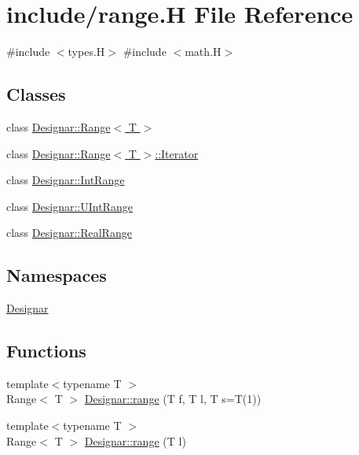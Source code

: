 \hypertarget{range_8_h}{}\section{include/range.H File Reference}
\label{range_8_h}
{\ttfamily \#include $<$types.\+H$>$}\newline
{\ttfamily \#include $<$math.\+H$>$}\newline
\subsection*{Classes}
\begin{DoxyCompactItemize}
\item 
class \hyperlink{class_designar_1_1_range}{Designar\+::\+Range$<$ T $>$}
\item 
class \hyperlink{class_designar_1_1_range_1_1_iterator}{Designar\+::\+Range$<$ T $>$\+::\+Iterator}
\item 
class \hyperlink{class_designar_1_1_int_range}{Designar\+::\+Int\+Range}
\item 
class \hyperlink{class_designar_1_1_u_int_range}{Designar\+::\+U\+Int\+Range}
\item 
class \hyperlink{class_designar_1_1_real_range}{Designar\+::\+Real\+Range}
\end{DoxyCompactItemize}
\subsection*{Namespaces}
\begin{DoxyCompactItemize}
\item 
 \hyperlink{namespace_designar}{Designar}
\end{DoxyCompactItemize}
\subsection*{Functions}
\begin{DoxyCompactItemize}
\item 
{\footnotesize template$<$typename T $>$ }\\Range$<$ T $>$ \hyperlink{namespace_designar_aae435a76c71e126af37716ef5549d79d}{Designar\+::range} (T f, T l, T s=T(1))
\item 
{\footnotesize template$<$typename T $>$ }\\Range$<$ T $>$ \hyperlink{namespace_designar_a98dd2d05fccceaa32cdbf3f34c7dc120}{Designar\+::range} (T l)
\end{DoxyCompactItemize}
